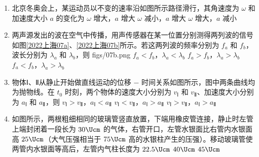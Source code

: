 \documentclass[\gkver]{gaokaozhenti}
\begin{document}
\begin{enumerate}
\item
北京冬奥会上，某运动员以不变的速率沿如图所示路径滑行，其角速度为 $\omega$ 和加速度大小 $a$ 的变化为
\onepicture[w=2.60cm]{}
{$\omega$ 增大，$a$ 增大}
{$\omega$ 减小，$a$ 增大}
{$\omega$ 增大，$a$ 减小}

\item
两声源发出的波在空气中传播，用声传感器在某一位置分别测得两列波的信号如图\ref{2022上海07a}、\ref{2022上海07b}所示。若这两列波的频率分别为 $f_{a}$ 和 $f_{b}$，波长分别为 $\lambda_{a}$ 和 $\lambda_{b}$，则
{figs/07b.png}
{$f_{a} < f_{b}$，$\lambda_{a} < \lambda_{b}$}
{$f_{a} > f_{b}$，$\lambda_{a} > \lambda_{b}$}
{$f_{a} < f_{b}$，$\lambda_{a} > \lambda_{b}$}

\item
物体Ⅰ、Ⅱ从静止开始做直线运动的位移 $-$ 时间关系如图所示，图中两条曲线均为抛物线。在 $t_{0}$ 时刻，两个物体的速度大小分别为 $v_{\text{Ⅰ}}$ 和 $v_{\text{Ⅱ}}$、加速度大小分别为 $a_{\text{Ⅰ}}$ 和 $a_{\text{Ⅱ}}$，则
\onepicture[w=3.20cm]{}
{$v_{\text{Ⅰ}} > v_{\text{Ⅱ}}$，$a_{\text{Ⅰ}} < a_{\text{Ⅱ}}$}
{$v_{\text{Ⅰ}} < v_{\text{Ⅱ}}$，$a_{\text{Ⅰ}} > a_{\text{Ⅱ}}$}
{$v_{\text{Ⅰ}} > v_{\text{Ⅱ}}$，$a_{\text{Ⅰ}} > a_{\text{Ⅱ}}$}

\item
如图所示，两根粗细相同的玻璃管竖直放置，下端用橡皮管连接，静止时左管上端封闭着一段长为 $30 \Ucm$ 的气体，右管开口，左管水银面比右管内水银面高 $25 \Ucm$（大气压强相当于 $75 \Ucm$ 高的水银柱产生的压强）。移动玻璃管使两管内水银面等高后，左管内气柱长度为
\onepicture[h=3.50cm]{}
\fourchoices[answer=A]
{$20 \Ucm$}
{$22.5 \Ucm$}
{$40 \Ucm$}
{$45 \Ucm$}
\end{enumerate}
\end{document}
